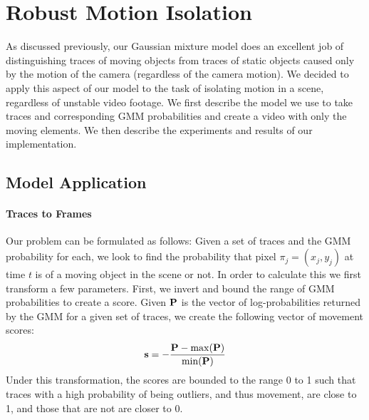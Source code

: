 \section{Robust Motion Isolation} 
\label{sec:motion}

As discussed previously, our Gaussian mixture model does an excellent job of
distinguishing traces of moving objects from traces of static objects caused
only by the motion of the camera (regardless of the camera motion).  We decided
to apply this aspect of our model to the task of isolating motion in a scene,
regardless of unstable video footage.  We first describe the model we use to
take traces and corresponding GMM probabilities and create a video with only the
moving elements.  We then describe the experiments and results of our
implementation.

\subsection{Model Application} %
\label{sub:Model Application}

\paragraph{Traces to Frames} %
\label{par:Traces to Frames}

Our problem can be formulated as follows: Given a set of traces and the GMM
probability for each, we look to find the probability that pixel $\pi_j =
(x_j,y_j)$ at time $t$ is of a moving object in the scene or not.  In order to
calculate this we first transform a few parameters.  First, we invert and bound
the range of GMM probabilities to create a  score.  Given ${\bf
P}$ is the vector of log-probabilities returned by the GMM for a given set of
traces, we create the following vector of movement scores:
\begin{align}
	{\bf s} = - \frac{ {\bf P} - {\rm max}({\bf P}) }{ {\rm min}({\bf P}) }
\end{align}
Under this transformation, the scores are bounded to the range 0 to 1 such that
traces with a high probability of being outliers, and thus movement, are close
to 1, and those that are not are closer to 0.

